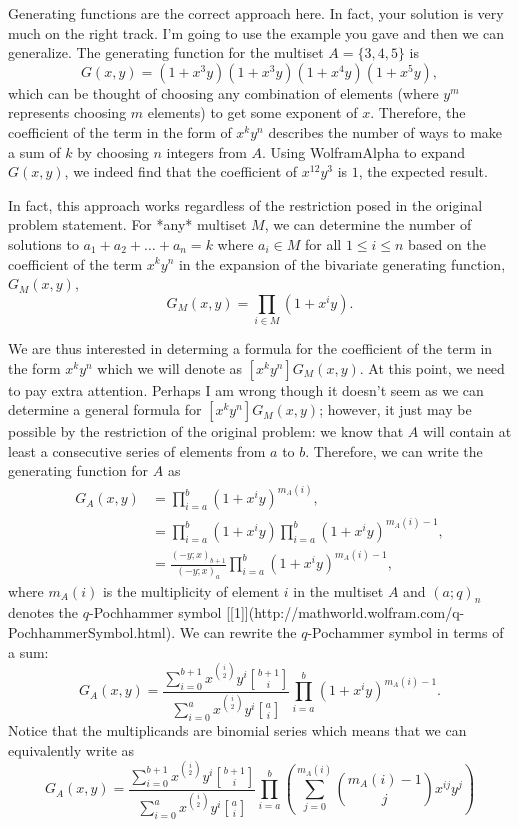 Generating functions are the correct approach here. In fact, your solution is very much on the right track. I'm going to use the example you gave and then we can generalize. The generating function for the multiset $A=\{3,4,5\}$ is 
$$
G(x,y)=(1+x^3y)(1+x^3y)(1+x^4y)(1+x^5y),
$$
which can be thought of choosing any combination of elements (where $y^m$ represents choosing $m$ elements) to get some exponent of $x$. Therefore, the coefficient of the term in the form of $x^k y^n$ describes the number of ways to make a sum of $k$ by choosing $n$ integers from $A$. Using WolframAlpha to expand $G(x,y)$, we indeed find that the coefficient of $x^{12}y^3$ is $1$, the expected result.

In fact, this approach works regardless of the restriction posed in the original problem statement. For *any* multiset $M$, we can determine the number of solutions to $a_1+a_2+\ldots+a_n=k$ where $a_i \in M$ for all $1 \leq i \leq n$ based on the coefficient of the term $x^k y^n$ in the expansion of the bivariate generating function, $G_M(x,y)$,
$$
G_M(x,y)=\prod_{i\in M}(1+x^iy).
$$

We are thus interested in determing a formula for the coefficient of the term in the form $x^k y^n$ which we will denote as $[x^ky^n]G_M(x,y)$. At this point, we need to pay extra attention. Perhaps I am wrong though it doesn't seem as we can determine a general formula for $[x^ky^n]G_M(x,y)$; however, it just may be possible by the restriction of the original problem: we know that $A$ will contain at least a consecutive series of elements from $a$ to $b$. Therefore, we can write the generating function for $A$ as
$$
\begin{align*}
G_A(x,y)&=\prod_{i=a}^b(1+x^iy)^{m_A(i)},\\
&=\prod_{i=a}^b(1+x^iy)\prod_{i=a}^b(1+x^iy)^{m_A(i)-1},\\
&=\frac{(-y;x)_{b+1}}{(-y;x)_a}\prod_{i=a}^b(1+x^iy)^{m_A(i)-1},
\end{align*}
$$
where $m_A(i)$ is the multiplicity of element $i$ in the multiset $A$ and $(a;q)_n$ denotes the $q$-Pochhammer symbol [[1]](http://mathworld.wolfram.com/q-PochhammerSymbol.html). We can rewrite the $q$-Pochammer symbol in terms of a sum:
$$
G_A(x,y)=\frac{\sum^{b+1}_{i=0}x^\binom{i}{2}y^i\genfrac{[}{]}{0pt}{}{b+1}{i}}{\sum^a_{i=0}x^\binom{i}{2}y^i\genfrac{[}{]}{0pt}{}{a}{i}}\prod_{i=a}^b(1+x^iy)^{m_A(i)-1}.$$
Notice that the multiplicands are binomial series which means that we can equivalently write as
$$
G_A(x,y)=\frac{\sum^{b+1}_{i=0}x^\binom{i}{2}y^i\genfrac{[}{]}{0pt}{}{b+1}{i}}{\sum^a_{i=0}x^\binom{i}{2}y^i\genfrac{[}{]}{0pt}{}{a}{i}}\prod_{i=a}^b\left(\sum_{j=0}^{m_A(i)}\binom{m_A(i)-1}{j}x^{ij}y^j\right)
$$

